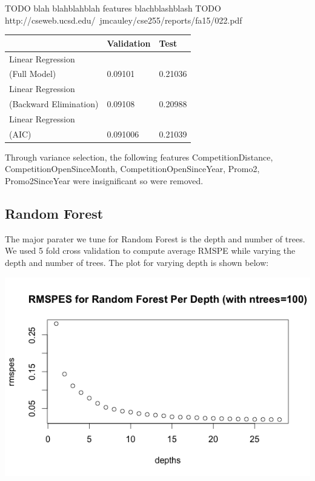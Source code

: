 \documentclass[letterpaper,twocolumn,11pt]{article}
\begin{document}
TODO blah blahblahblah features blachblashblash 
TODO http://cseweb.ucsd.edu/~jmcauley/cse255/reports/fa15/022.pdf

\begin{center}
    \begin{tabular}{| l | l | l |}
      \hline
       & Validation & Test \\ \hline
      Linear Regression \\
      (Full Model) & 0.09101 & 0.21036 \\ \hline
      Linear Regression \\
      (Backward Elimination) & 0.09108 & 0.20988 \\ \hline
      Linear Regression \\
      (AIC) & 0.091006 & 0.21039 \\ \hline
      \hline    
    \end{tabular}
\end{center}

Through variance selection, the following features CompetitionDistance, CompetitionOpenSinceMonth, CompetitionOpenSinceYear, Promo2, Promo2SinceYear were insignificant so were removed.

\subsection{Random Forest}
The major parater we tune for Random Forest is the depth and number of trees. We used 5 fold cross validation to compute average RMSPE while varying the depth and number of trees. The plot for varying depth is shown below:

\includegraphics[scale=0.35]{img/RandomForestPerDepth.png}
\end{document}
